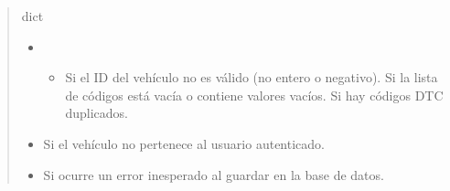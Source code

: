 \documentclass[letterpaper,10pt,spanish]{sphinxmanual}
\begin{document}
\begin{fulllineitems}
\begin{quote}
\begin{description}
\sphinxAtStartPar
dict

\begin{itemize}
\item {} 
\sphinxAtStartPar
{} \textendash{} \begin{itemize}
\item {} 
\sphinxAtStartPar
Si el ID del vehículo no es válido (no entero o negativo).
    \sphinxhyphen{} Si la lista de códigos está vacía o contiene valores vacíos.
    \sphinxhyphen{} Si hay códigos DTC duplicados.

\end{itemize}


\item {} 
\sphinxAtStartPar
{} \textendash{} Si el vehículo no pertenece al usuario autenticado.

\item {} 
\sphinxAtStartPar
{} \textendash{} Si ocurre un error inesperado al guardar en la base de datos.

\end{itemize}

\end{description}\end{quote}

\end{fulllineitems}

\end{document}
